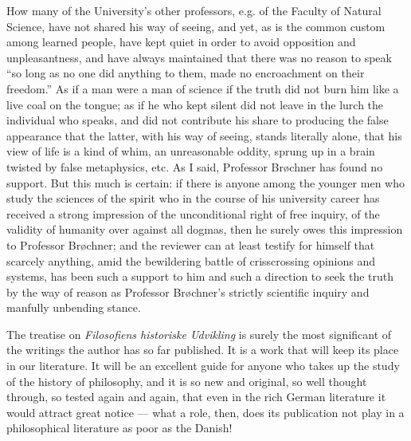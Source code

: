 \documentclass[12pt,a4paper,openany]{book}
\begin{document}
How many of the University's other professors, e.g. of the
Faculty of Natural Science, have not shared his way of seeing,
and yet, as is the common custom among learned people, have kept
quiet in order to avoid opposition and unpleasantness, and have
always maintained that there was no reason to speak ``so long as
no one did anything to them, made no encroachment on their
freedom.'' As if a man were a man of science if the truth did not
burn him like a live coal on the tongue; as if he who kept silent
did not leave in the lurch the individual who speaks, and did not
contribute his share to producing the false appearance that the
latter, with his way of seeing, stands literally alone, that his
view of life is a kind of whim, an unreasonable oddity, sprung up
in a brain twisted by false metaphysics, etc. As I said, Professor
Brøchner has found no support. But this much is certain: if there
is anyone among the younger men who study the sciences of the
spirit who in the course of his university career has received a
strong impression of the unconditional right of free inquiry, of
the validity of humanity over against all dogmas, then he surely
owes this impression to Professor Brøchner; and the reviewer can
at least testify for himself that scarcely anything, amid the
bewildering battle of crisscrossing opinions and systems, has been
such a support to him and such a direction to seek the truth by
the way of reason as Professor Brøchner's strictly scientific
inquiry and manfully unbending stance.

The treatise on \emph{Filosofiens historiske Udvikling} is surely
the most significant of the writings the author has so far
published. It is a work that will keep its place in our
literature. It will be an excellent guide for anyone who takes up
the study of the history of philosophy, and it is so new and
original, so well thought through, so tested again and again, that
even in the rich German literature it would attract great notice
--- what a role, then, does its publication not play in a
philosophical literature as poor as the Danish!
\end{document}
